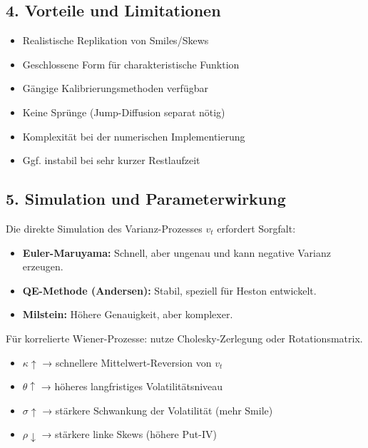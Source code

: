 \documentclass[a4paper,12pt]{article}
\begin{document}
\subsection*{4. Vorteile und Limitationen}
\begin{tcolorbox}[title=Vorteile]
\begin{itemize}
  \item Realistische Replikation von Smiles/Skews
  \item Geschlossene Form für charakteristische Funktion
  \item Gängige Kalibrierungsmethoden verfügbar
\end{itemize}
\end{tcolorbox}

\begin{tcolorbox}[title=Limitationen]
\begin{itemize}
  \item Keine Sprünge (Jump-Diffusion separat nötig)
  \item Komplexität bei der numerischen Implementierung
  \item Ggf. instabil bei sehr kurzer Restlaufzeit
\end{itemize}
\end{tcolorbox}



\subsection*{5. Simulation und Parameterwirkung}
\begin{tcolorbox}[title=Simulationstipp]
    Die direkte Simulation des Varianz-Prozesses \(v_t\) erfordert Sorgfalt:
    \begin{itemize}
    \item \textbf{Euler-Maruyama:} Schnell, aber ungenau und kann negative Varianz erzeugen.
    \item \textbf{QE-Methode (Andersen):} Stabil, speziell für Heston entwickelt.
    \item \textbf{Milstein:} Höhere Genauigkeit, aber komplexer.
    \end{itemize}
    Für korrelierte Wiener-Prozesse: nutze Cholesky-Zerlegung oder Rotationsmatrix.
\end{tcolorbox}

\begin{tcolorbox}[title=Intuition für Parameterwirkung]
\begin{itemize}
  \item $\kappa \uparrow$ → schnellere Mittelwert-Reversion von $v_t$
  \item $\theta \uparrow$ → höheres langfristiges Volatilitätsniveau
  \item $\sigma \uparrow$ → stärkere Schwankung der Volatilität (mehr Smile)
  \item $\rho \downarrow$ → stärkere linke Skews (höhere Put-IV)
\end{itemize}
\end{tcolorbox}
\end{document}
